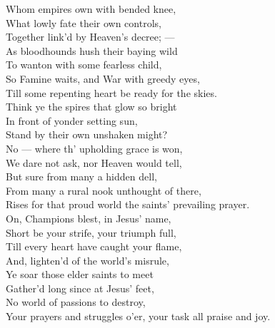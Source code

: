  Whom empires own with bended knee, \\
 What lowly fate their own controls, \\
 Together link’d by Heaven’s decree; — \\
 As bloodhounds hush their baying wild \\
 To wanton with some fearless child, \\
 So Famine waits, and War with greedy eyes, \\
 Till some repenting heart be ready for the skies. \\
  Think ye the spires that glow so bright \\
 In front of yonder setting sun, \\
 Stand by their own unshaken might? \\
 No — where th’ upholding grace is won, \\
 We dare not ask, nor Heaven would tell, \\
 But sure from many a hidden dell, \\
 From many a rural nook unthought of there, \\
 Rises for that proud world the saints’ prevailing prayer. \\
  On, Champions blest, in Jesus’ name, \\
 Short be your strife, your triumph full, \\
 Till every heart have caught your flame, \\
 And, lighten’d of the world’s misrule, \\
 Ye soar those elder saints to meet \\
 Gather’d long since at Jesus’ feet, \\
 No world of passions to destroy, \\
 Your prayers and struggles o’er, your task all praise and joy.\\


